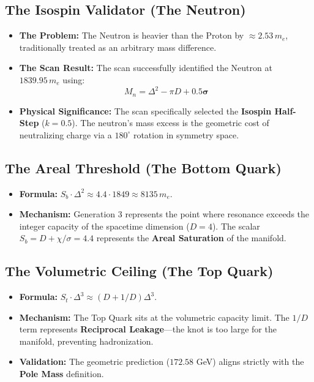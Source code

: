\subsection*{The Isospin Validator (The Neutron)}
\begin{itemize}
    \item \textbf{The Problem:} The Neutron is heavier than the Proton by $\approx 2.53 \, m_e$, traditionally treated as an arbitrary mass difference.
    \item \textbf{The Scan Result:} The scan successfully identified the Neutron at $1839.95 \, m_e$ using:
    \[ M_n = \Delta^2 - \pi D + \mathbf{0.5 \sigma} \]
    \item \textbf{Physical Significance:} The scan specifically selected the \textbf{Isospin Half-Step} ($k=0.5$). The neutron's mass excess is the geometric cost of neutralizing charge via a $180^\circ$ rotation in symmetry space.
\end{itemize}

\subsection*{The Areal Threshold (The Bottom Quark)}
\begin{itemize}
    \item \textbf{Formula:} $S_b \cdot \Delta^2 \approx 4.4 \cdot 1849 \approx 8135 \, m_e$.
    \item \textbf{Mechanism:} Generation 3 represents the point where resonance exceeds the integer capacity of the spacetime dimension ($D=4$). The scalar $S_b = D + \chi/\sigma = 4.4$ represents the \textbf{Areal Saturation} of the manifold.
\end{itemize}

\subsection*{The Volumetric Ceiling (The Top Quark)}
\begin{itemize}
    \item \textbf{Formula:} $S_t \cdot \Delta^3 \approx (D + 1/D)\Delta^3$.
    \item \textbf{Mechanism:} The Top Quark sits at the volumetric capacity limit. The $1/D$ term represents \textbf{Reciprocal Leakage}—the knot is too large for the manifold, preventing hadronization.
    \item \textbf{Validation:} The geometric prediction ($172.58$ GeV) aligns strictly with the \textbf{Pole Mass} definition.
\end{itemize}

